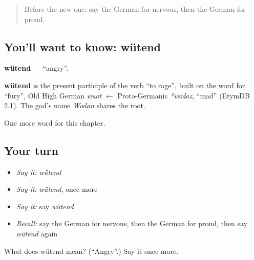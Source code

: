 \label{lesson:GE-C169-wuetend}



\begin{quote}
Before the new one: say the German for nervous, then the German for proud.
\end{quote}

\subsection*{You'll want to know: wütend}
\textbf{wütend} — \textquotedblleft{}angry\textquotedblright{}.

\begin{cousinweb}
\textbf{wütend} is the present participle of the verb \textquotedblleft{}to rage\textquotedblright{}, built on the word for \textquotedblleft{}fury\textquotedblright{}, Old High German \emph{wuot} $\leftarrow$ Proto-Germanic \emph{*wōdaz}, \textquotedblleft{}mad\textquotedblright{} (EtymDB 2.1). The god's name \emph{Wodan} shares the root.
\end{cousinweb}

\begin{grammarlens}[title={What you've built}]
One more word for this chapter.
\end{grammarlens}

\subsection*{Your turn}
\begin{itemize}
\raggedright
  \item \emph{Say it:} \emph{wütend}
  \item \emph{Say it:} \emph{wütend}, once more
  \item \emph{Say it:} say \emph{wütend}
  \item \emph{Recall:} say the German for nervous, then the German for proud, then say \emph{wütend} again
\end{itemize}

\begin{tcolorbox}[breakable,colback=teal!4,colframe=teal!35!black,title={Before you move on}]
What does wütend mean? (\textquotedblleft{}Angry\textquotedblright{}.) Say it once more.
\end{tcolorbox}
